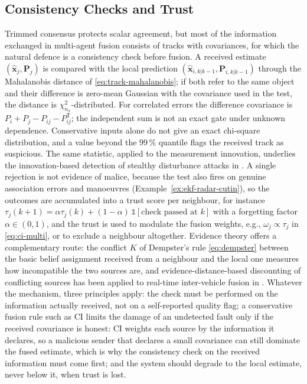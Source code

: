 \subsection{Consistency Checks and Trust}
\label{subsec:mas-trust}

Trimmed consensus protects scalar agreement, but most of the information exchanged in multi-agent fusion consists of tracks with covariances, for which the natural defence is a consistency check before fusion. A received estimate $(\widehat{\mathbf{x}}_j,\mathbf{P}_j)$ is compared with the local prediction $(\widehat{\mathbf{x}}_{i,k|k-1},\mathbf{P}_{i,k|k-1})$ through the Mahalanobis distance of \eqref{eq:track-mahalanobis}; if both refer to the same object and their difference is zero-mean Gaussian with the covariance used in the test, the distance is $\chi^2_{n_x}$-distributed. For correlated errors the difference covariance is $P_i+P_j-P_{ij}-P_{ij}^{\mathsf T}$; the independent sum is not an exact gate under unknown dependence. Conservative inputs alone do not give an exact chi-square distribution, and a value beyond the $99\,\%$ quantile flags the received track as suspicious. The same statistic, applied to the measurement innovation, underlies the innovation-based detection of stealthy disturbance attacks in \cite{oliva_innovation_2026}. A single rejection is not evidence of malice, because the test also fires on genuine association errors and manoeuvres (Example~\ref{ex:ekf-radar-cutin}), so the outcomes are accumulated into a trust score per neighbour, for instance $\tau_j(k+1)=\alpha\tau_j(k)+(1-\alpha)\,\mathbb{1}[\text{check passed at }k]$ with a forgetting factor $\alpha\in(0,1)$, and the trust is used to modulate the fusion weights, e.g., $\omega_j\propto\tau_j$ in \eqref{eq:ci-multi}, or to exclude a neighbour altogether. Evidence theory offers a complementary route: the conflict $K$ of Dempster's rule \eqref{eq:dempster} between the basic belief assignment received from a neighbour and the local one measures how incompatible the two sources are, and evidence-distance-based discounting of conflicting sources has been applied to real-time inter-vehicle fusion in \cite{cho_realtime_2020}. Whatever the mechanism, three principles apply: the check must be performed on the information actually received, not on a self-reported quality flag; a conservative fusion rule such as CI limits the damage of an undetected fault only if the received covariance is honest: CI weights each source by the information it declares, so a malicious sender that declares a small covariance can still dominate the fused estimate, which is why the consistency check on the received information must come first; and the system should degrade to the local estimate, never below it, when trust is lost.

